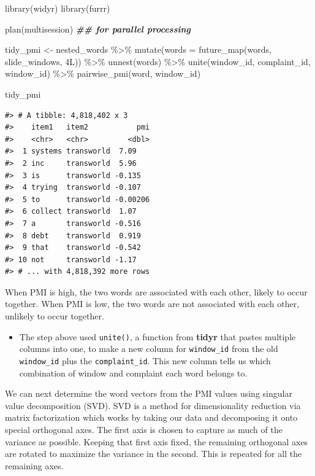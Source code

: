\documentclass[
]{krantz}
\makeatletter
\newenvironment{Shaded}{\begin{snugshade}}{\end{snugshade}}
\newcommand{\AttributeTok}[1]{\textcolor[rgb]{0.77,0.63,0.00}{#1}}
\newcommand{\DocumentationTok}[1]{\textcolor[rgb]{0.56,0.35,0.01}{\textbf{\textit{#1}}}}
\newcommand{\FunctionTok}[1]{\textcolor[rgb]{0.00,0.00,0.00}{#1}}
\newcommand{\NormalTok}[1]{#1}
\newcommand{\OtherTok}[1]{\textcolor[rgb]{0.56,0.35,0.01}{#1}}
\newcommand{\SpecialCharTok}[1]{\textcolor[rgb]{0.00,0.00,0.00}{#1}}
\newenvironment{kframe}{%
\medskip{}
\setlength{\fboxsep}{.8em}
 \def\at@end@of@kframe{}%
 \ifinner\ifhmode%
  \def\at@end@of@kframe{\end{minipage}}%
  \begin{minipage}{\columnwidth}%
 \fi\fi%
 \def\FrameCommand##1{\hskip\@totalleftmargin \hskip-\fboxsep
 \colorbox{shadecolor}{##1}\hskip-\fboxsep
     \hskip-\linewidth \hskip-\@totalleftmargin \hskip\columnwidth}%
 \MakeFramed {\advance\hsize-\width
   \@totalleftmargin\z@ \linewidth\hsize
   \@setminipage}}%
 {\par\unskip\endMakeFramed%
 \at@end@of@kframe}
\renewenvironment{Shaded}{\begin{kframe}}{\end{kframe}}
\newenvironment{rmdblock}[1]
  {\begin{shaded*}
  \begin{itemize}[left = -1cm, labelsep = 1cm]
  \renewcommand{\labelitemi}{
    \raisebox{-.7\height}[0pt][0pt]{
      {\setkeys{Gin}{width=3em,keepaspectratio}\texttt{[image: images/\#1]}}
    }
  }
 
  \item
  }
  {
  \end{itemize}
  \end{shaded*}
  }
\newenvironment{rmdwarning}
  {\begin{rmdblock}{warning}}
  {\end{rmdblock}}
\makeatother
\begin{document}
\begin{Shaded}
\begin{Highlighting}[]
\FunctionTok{library}\NormalTok{(widyr)}
\FunctionTok{library}\NormalTok{(furrr)}

\FunctionTok{plan}\NormalTok{(multisession)  }\DocumentationTok{\#\# for parallel processing}

\NormalTok{tidy\_pmi }\OtherTok{\textless{}{-}}\NormalTok{ nested\_words }\SpecialCharTok{\%\textgreater{}\%}
  \FunctionTok{mutate}\NormalTok{(}\AttributeTok{words =} \FunctionTok{future\_map}\NormalTok{(words, slide\_windows, 4L)) }\SpecialCharTok{\%\textgreater{}\%}
  \FunctionTok{unnest}\NormalTok{(words) }\SpecialCharTok{\%\textgreater{}\%}
  \FunctionTok{unite}\NormalTok{(window\_id, complaint\_id, window\_id) }\SpecialCharTok{\%\textgreater{}\%}
  \FunctionTok{pairwise\_pmi}\NormalTok{(word, window\_id)}

\NormalTok{tidy\_pmi}
\end{Highlighting}
\end{Shaded}

\begin{verbatim}
#> # A tibble: 4,818,402 x 3
#>    item1   item2           pmi
#>    <chr>   <chr>         <dbl>
#>  1 systems transworld  7.09   
#>  2 inc     transworld  5.96   
#>  3 is      transworld -0.135  
#>  4 trying  transworld -0.107  
#>  5 to      transworld -0.00206
#>  6 collect transworld  1.07   
#>  7 a       transworld -0.516  
#>  8 debt    transworld  0.919  
#>  9 that    transworld -0.542  
#> 10 not     transworld -1.17   
#> # ... with 4,818,392 more rows
\end{verbatim}

When PMI is high, the two words are associated with each other, likely to occur together. When PMI is low, the two words are not associated with each other, unlikely to occur together.

\begin{rmdwarning}
The step above used \texttt{unite()}, a function from \textbf{tidyr}
that pastes multiple columns into one, to make a new column for
\texttt{window\_id} from the old \texttt{window\_id} plus the
\texttt{complaint\_id}. This new column tells us which combination of
window and complaint each word belongs to.
\end{rmdwarning}

We can next determine the word vectors from the PMI values using singular value decomposition (SVD).
SVD is a method for dimensionality reduction via matrix factorization \citep{Golub1970} which works by taking our data and decomposing it onto special orthogonal axes. The first axis is chosen to capture as much of the variance as possible. Keeping that first axis fixed, the remaining orthogonal axes are rotated to maximize the variance in the second. This is repeated for all the remaining axes.
\end{document}
